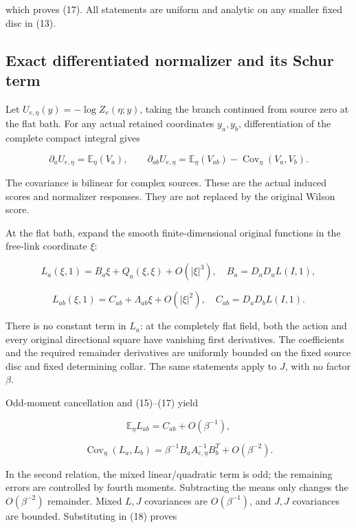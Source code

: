 \documentclass[
  11pt,
]{article}
\begin{document}
which proves (17). All statements are uniform and analytic on any
smaller fixed disc in (13).

\hypertarget{exact-differentiated-normalizer-and-its-schur-term}{%
\subsection{Exact differentiated normalizer and its Schur
term}\label{exact-differentiated-normalizer-and-its-schur-term}}

Let \(U_{e,\eta}(y)=-\log Z_e(\eta;y)\), taking the branch continued
from source zero at the flat bath. For any actual retained coordinates
\(y_a,y_b\), differentiation of the complete compact integral gives

\[
 \partial_aU_{e,\eta}=\mathbb E_\eta(V_a),
 \qquad
 \partial_{ab}U_{e,\eta}
 =\mathbb E_\eta(V_{ab})
  -\operatorname{Cov}_\eta(V_a,V_b).              \tag{18}
\]

The covariance is bilinear for complex sources. These are the actual
induced scores and normalizer responses. They are not replaced by the
original Wilson score.

At the flat bath, expand the smooth finite-dimensional original
functions in the free-link coordinate \(\xi\):

\[
 L_a(\xi,1)=B_a\xi+Q_a(\xi,\xi)+O(|\xi|^3),
 \quad B_a=D_aD_uL(I,1),
\]

\[
 L_{ab}(\xi,1)=C_{ab}+\Lambda_{ab}\xi+O(|\xi|^2),
 \quad C_{ab}=D_aD_bL(I,1).
                                                        \tag{19}
\]

There is no constant term in \(L_a\): at the completely flat field, both
the action and every original directional square have vanishing first
derivatives. The coefficients and the required remainder derivatives are
uniformly bounded on the fixed source disc and fixed determining collar.
The same statements apply to \(J\), with no factor \(\beta\).

Odd-moment cancellation and (15)--(17) yield

\[
 \mathbb E_\eta L_{ab}=C_{ab}+O(\beta^{-1}),
\]

\[
 \operatorname{Cov}_\eta(L_a,L_b)
 =\beta^{-1}B_aA_{e,\eta}^{-1}B_b^T+O(\beta^{-2}).
                                                        \tag{20}
\]

In the second relation, the mixed linear/quadratic term is odd; the
remaining errors are controlled by fourth moments. Subtracting the means
only changes the \(O(\beta^{-2})\) remainder. Mixed \(L,J\) covariances
are \(O(\beta^{-1})\), and \(J,J\) covariances are bounded. Substituting
in (18) proves
\end{document}
